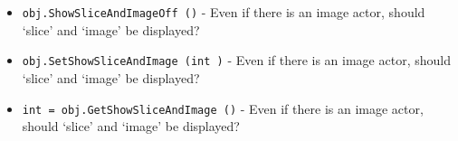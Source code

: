 \begin{itemize}
\item  \verb|obj.ShowSliceAndImageOff ()| -  Even if there is an image actor, should `slice' and `image' be displayed?

\item  \verb|obj.SetShowSliceAndImage (int )| -  Even if there is an image actor, should `slice' and `image' be displayed?

\item  \verb|int = obj.GetShowSliceAndImage ()| -  Even if there is an image actor, should `slice' and `image' be displayed?

\end{itemize}
